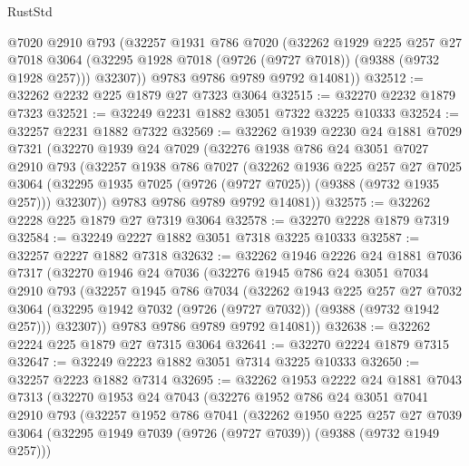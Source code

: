 \begin{lexlean}{RustStd}
\begin{coremodule}
        @7020
        @2910
        @793
        (@32257
          @1931
          @786
          @7020
          (@32262
            @1929
            @225
            @257
            @27
            @7018
            @3064
            (@32295 @1928 @7018 (@9726 (@9727 @7018)) (@9388 (@9732 @1928 @257)))
            @32307))
        @9783
        @9786
        @9789
        @9792
        @14081))
@32512 := @32262 @2232 @225 @1879 @27 @7323 @3064
@32515 := @32270 @2232 @1879 @7323
@32521 := @32249 @2231 @1882 @3051 @7322 @3225 @10333
@32524 := @32257 @2231 @1882 @7322
@32569 := @32262
    @1939
    @2230
    @24
    @1881
    @7029
    @7321
    (@32270
      @1939
      @24
      @7029
      (@32276
        @1938
        @786
        @24
        @3051
        @7027
        @2910
        @793
        (@32257
          @1938
          @786
          @7027
          (@32262
            @1936
            @225
            @257
            @27
            @7025
            @3064
            (@32295 @1935 @7025 (@9726 (@9727 @7025)) (@9388 (@9732 @1935 @257)))
            @32307))
        @9783
        @9786
        @9789
        @9792
        @14081))
@32575 := @32262 @2228 @225 @1879 @27 @7319 @3064
@32578 := @32270 @2228 @1879 @7319
@32584 := @32249 @2227 @1882 @3051 @7318 @3225 @10333
@32587 := @32257 @2227 @1882 @7318
@32632 := @32262
    @1946
    @2226
    @24
    @1881
    @7036
    @7317
    (@32270
      @1946
      @24
      @7036
      (@32276
        @1945
        @786
        @24
        @3051
        @7034
        @2910
        @793
        (@32257
          @1945
          @786
          @7034
          (@32262
            @1943
            @225
            @257
            @27
            @7032
            @3064
            (@32295 @1942 @7032 (@9726 (@9727 @7032)) (@9388 (@9732 @1942 @257)))
            @32307))
        @9783
        @9786
        @9789
        @9792
        @14081))
@32638 := @32262 @2224 @225 @1879 @27 @7315 @3064
@32641 := @32270 @2224 @1879 @7315
@32647 := @32249 @2223 @1882 @3051 @7314 @3225 @10333
@32650 := @32257 @2223 @1882 @7314
@32695 := @32262
    @1953
    @2222
    @24
    @1881
    @7043
    @7313
    (@32270
      @1953
      @24
      @7043
      (@32276
        @1952
        @786
        @24
        @3051
        @7041
        @2910
        @793
        (@32257
          @1952
          @786
          @7041
          (@32262
            @1950
            @225
            @257
            @27
            @7039
            @3064
            (@32295 @1949 @7039 (@9726 (@9727 @7039)) (@9388 (@9732 @1949 @257)))

\end{coremodule}
\end{lexlean}

